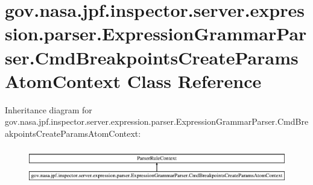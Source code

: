 \hypertarget{classgov_1_1nasa_1_1jpf_1_1inspector_1_1server_1_1expression_1_1parser_1_1_expression_grammar_paa3acc222754f42ff002c5d98d8d38136}{}\section{gov.\+nasa.\+jpf.\+inspector.\+server.\+expression.\+parser.\+Expression\+Grammar\+Parser.\+Cmd\+Breakpoints\+Create\+Params\+Atom\+Context Class Reference}
\label{classgov_1_1nasa_1_1jpf_1_1inspector_1_1server_1_1expression_1_1parser_1_1_expression_grammar_paa3acc222754f42ff002c5d98d8d38136}
Inheritance diagram for gov.\+nasa.\+jpf.\+inspector.\+server.\+expression.\+parser.\+Expression\+Grammar\+Parser.\+Cmd\+Breakpoints\+Create\+Params\+Atom\+Context\+:\begin{figure}[H]
\begin{center}
\leavevmode
\includegraphics[height=1.616162cm]{classgov_1_1nasa_1_1jpf_1_1inspector_1_1server_1_1expression_1_1parser_1_1_expression_grammar_paa3acc222754f42ff002c5d98d8d38136}
\end{center}
\end{figure}
